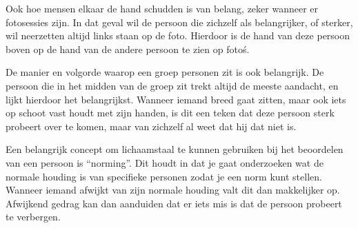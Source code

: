 \documentclass[11pt,english]{article}
\begin{document}
	Ook hoe mensen elkaar de hand schudden is van belang, zeker wanneer er
	fotosessies zijn. In dat geval wil de persoon die zichzelf als
	belangrijker, of sterker, wil neerzetten altijd links staan op de foto.
	Hierdoor is de hand van deze persoon boven op de hand van de andere persoon
	te zien op foto\'s.

	De manier en volgorde waarop een groep personen zit is ook belangrijk. De
	persoon die in het midden van de groep zit trekt altijd de meeste aandacht,
	en lijkt hierdoor het belangrijkst. Wanneer iemand breed gaat zitten, maar
	ook iets op schoot vast houdt met zijn handen, is dit een teken dat deze
	persoon sterk probeert over te komen, maar van zichzelf al weet dat hij dat
	niet is.

	Een belangrijk concept om lichaamstaal te kunnen gebruiken bij het
	beoordelen van een persoon is ``norming''. Dit houdt in dat je gaat
	onderzoeken wat de normale houding is van specifieke personen zodat je een
	norm kunt stellen. Wanneer iemand afwijkt van zijn normale houding valt dit
	dan makkelijker op. Afwijkend gedrag kan dan aanduiden dat er iets mis is
	dat de persoon probeert te verbergen.
\end{document}
